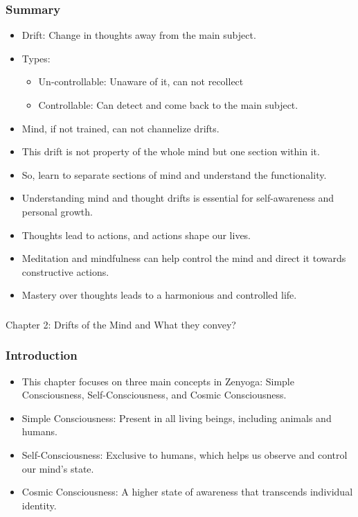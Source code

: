 \begin{frame}[fragile]\frametitle{Summary}

\begin{itemize}
	\item Drift: Change in thoughts away from the main subject.
	\item Types:
		\begin{itemize}
			\item Un-controllable: Unaware of it, can not recollect
			\item Controllable: Can detect and come back to the main subject.
		\end{itemize}
	\item Mind, if not trained, can not channelize drifts.
	\item This drift is not property of the whole mind but one section within it.
	\item So, learn to separate sections of mind and understand the functionality.
    \item Understanding mind and thought drifts is essential for self-awareness and personal growth.
    \item Thoughts lead to actions, and actions shape our lives.
    \item Meditation and mindfulness can help control the mind and direct it towards constructive actions.
    \item Mastery over thoughts leads to a harmonious and controlled life.
\end{itemize}

\end{frame}

\begin{frame}[fragile]\frametitle{}
\begin{center}
{\Large Chapter 2: Drifts of the Mind and What they convey?}
\end{center}
\end{frame}


\begin{frame}[fragile]\frametitle{Introduction}
  \begin{itemize}
    \item This chapter focuses on three main concepts in Zenyoga: Simple Consciousness, Self-Consciousness, and Cosmic Consciousness.
    \item Simple Consciousness: Present in all living beings, including animals and humans.
    \item Self-Consciousness: Exclusive to humans, which helps us observe and control our mind's state.
    \item Cosmic Consciousness: A higher state of awareness that transcends individual identity.
  \end{itemize}
\end{frame}

